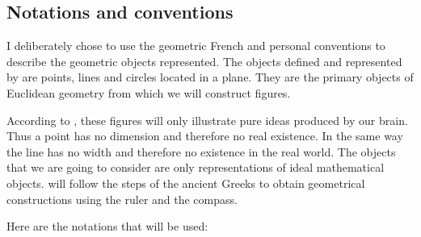 \begin{minipage}{0.5\textwidth}
\end{minipage}
\begin{minipage}{0.5\textwidth}
  \begin{tkzexample}
  \end{tkzexample}
\end{minipage}

\subsection{Notations and conventions}

I deliberately chose to use the geometric French and personal  conventions  to describe the geometric objects represented. The objects defined and represented by \tkzname{\tkznameofpack} are points, lines and circles located in a plane. They are the primary objects of Euclidean geometry from which we will construct figures.

According to , these figures will only illustrate pure ideas produced by our brain.
Thus a point has no dimension and therefore no real existence. In the same way the line has no width and therefore no existence in the real world. The objects that we are going to consider are only representations of ideal mathematical objects. \tkzname{\tkznameofpack} will follow the steps of the ancient Greeks to obtain geometrical constructions using the ruler and the compass. 

Here are the notations that will be used:

